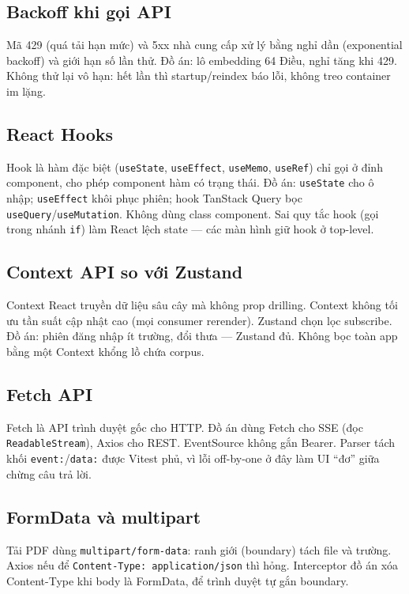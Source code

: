 \subsection{Backoff khi gọi API}

Mã 429 (quá tải hạn mức) và 5xx nhà cung cấp xử lý bằng nghỉ dần (exponential
backoff) và giới hạn số lần thử. Đồ án: lô embedding 64 Điều, nghỉ tăng khi 429.
Không thử lại vô hạn: hết lần thì startup/reindex báo lỗi, không treo container
im lặng.

\subsection{React Hooks}

Hook là hàm đặc biệt (\texttt{useState}, \texttt{useEffect}, \texttt{useMemo},
\texttt{useRef}) chỉ gọi ở đỉnh component, cho phép component hàm có trạng thái.
Đồ án: \texttt{useState} cho ô nhập; \texttt{useEffect} khôi phục phiên; hook
TanStack Query bọc \texttt{useQuery}/\texttt{useMutation}. Không dùng class
component. Sai quy tắc hook (gọi trong nhánh \texttt{if}) làm React lệch state
--- các màn hình giữ hook ở top-level.

\subsection{Context API so với Zustand}

Context React truyền dữ liệu sâu cây mà không prop drilling. Context không tối
ưu tần suất cập nhật cao (mọi consumer rerender). Zustand chọn lọc subscribe.
Đồ án: phiên đăng nhập ít trường, đổi thưa --- Zustand đủ. Không bọc toàn app
bằng một Context khổng lồ chứa corpus.

\subsection{Fetch API}

Fetch là API trình duyệt gốc cho HTTP. Đồ án dùng Fetch cho SSE (đọc
\texttt{ReadableStream}), Axios cho REST. EventSource không gắn Bearer. Parser
tách khối \texttt{event:}/\texttt{data:} được Vitest phủ, vì lỗi off-by-one ở
đây làm UI ``đơ'' giữa chừng câu trả lời.

\subsection{FormData và multipart}

Tải PDF dùng \texttt{multipart/form-data}: ranh giới (boundary) tách file và
trường. Axios nếu để \texttt{Content-Type: application/json} thì hỏng. Interceptor
đồ án xóa Content-Type khi body là FormData, để trình duyệt tự gắn boundary.

